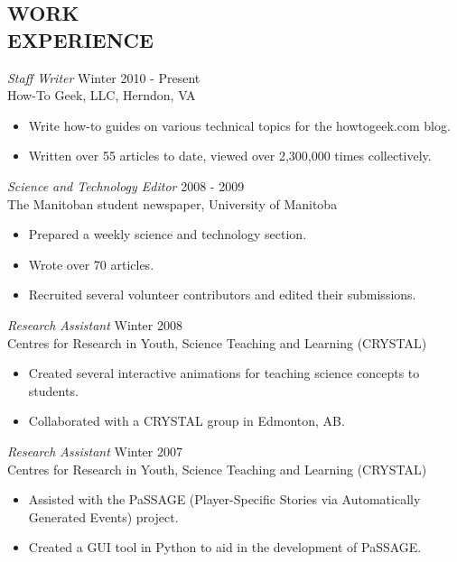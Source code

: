 \documentclass[line,margin]{res}
\begin{document}
\begin{resume}
\section{WORK \\EXPERIENCE}
  {\sl Staff Writer} \hfill Winter 2010 - Present \\
  How-To Geek, LLC, Herndon, VA
  \begin{itemize}  \itemsep -2pt %
    \item Write how-to guides on various technical topics for the howtogeek.com blog.
    \item Written over 55 articles to date, viewed over 2,300,000 times collectively.
  \end{itemize}
  
  {\sl Science and Technology Editor} \hfill 2008 - 2009 \\
  The Manitoban student newspaper, University of Manitoba
  \begin{itemize}  \itemsep -2pt %
    \item Prepared a weekly science and technology section.
    \item Wrote over 70 articles.
    \item Recruited several volunteer contributors and edited their submissions.
  \end{itemize}
  
  {\sl Research Assistant} \hfill Winter 2008 \\
  Centres for Research in Youth, Science Teaching and Learning (CRYSTAL)
  \begin{itemize}  \itemsep -2pt %
    \item Created several interactive animations for teaching science concepts to students.
    \item Collaborated with a CRYSTAL group in Edmonton, AB.
  \end{itemize}
  
  {\sl Research Assistant} \hfill Winter 2007 \\
  Centres for Research in Youth, Science Teaching and Learning (CRYSTAL)
  \begin{itemize}  \itemsep -2pt %
    \item Assisted with the PaSSAGE (Player-Specific Stories via Automatically Generated Events) project.
    \item Created a GUI tool in Python to aid in the development of PaSSAGE.
  \end{itemize}


\end{resume}
\end{document}
